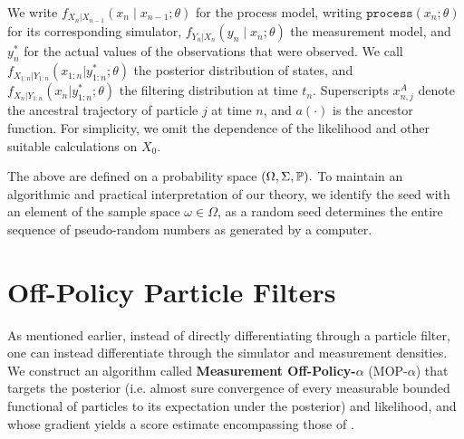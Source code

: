 \documentclass[9pt,twocolumn,twoside]{pnas-new}
\begin{document}

We write $f_{X_n|X_{n-1}}\left(x_{n} \mid x_{n-1}; \theta\right)$ for the process model, writing $\texttt{process}\left(x_n; \theta\right)$ for its corresponding simulator, $f_{Y_n|X_n}\left(y_n \mid x_n; \theta\right)$ the measurement model, and $y_n^*$ for the actual values of the observations that were observed. We call $f_{X_{1:n}|Y_{1:n}}(x_{1:n}|y_{1:n}^*; \theta)$ the posterior distribution of states, and $f_{X_{n}|Y_{1:n}}(x_n|y_{1:n}^*; \theta)$ the filtering distribution at time $t_n$. Superscripts $x_{n,j}^A$ denote the ancestral trajectory of particle $j$ at time $n$, and $a(\cdot)$ is the ancestor function. For simplicity, we omit the dependence of the likelihood and other suitable calculations on $X_0.$ 

The above are defined on a probability space $(\Omega, \Sigma, \mathbb{P}).$ 
To maintain an algorithmic and practical interpretation of our theory, we identify the seed with an element of the sample space $\omega \in \Omega$, as a random seed determines the entire sequence of pseudo-random numbers as generated by a computer. 



\section{Off-Policy Particle Filters}

As mentioned earlier, instead of directly differentiating through a particle filter, one can instead differentiate through the simulator and measurement densities. We construct an algorithm called \textbf{Measurement Off-Policy-$\alpha$} (MOP-$\alpha$) that targets the posterior (i.e. almost sure convergence of every measurable bounded functional of particles to its expectation under the posterior) and likelihood, and whose gradient yields a score estimate encompassing those of \cite{poyiadjis11, scibior21,naesseth18}.
\end{document}
